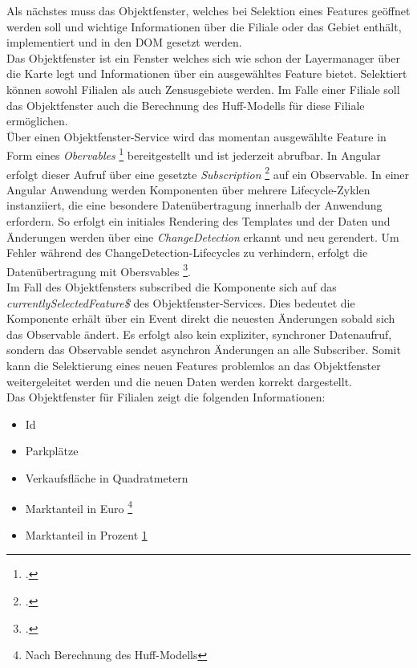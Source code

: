 Als nächstes muss das Objektfenster, welches bei Selektion eines Features geöffnet werden soll und wichtige Informationen über die Filiale oder das Gebiet enthält, implementiert und in den DOM gesetzt werden.\\
Das Objektfenster ist ein Fenster welches sich wie schon der Layermanager über die Karte legt und Informationen über ein ausgewähltes Feature bietet. 
Selektiert können sowohl Filialen als auch Zensusgebiete werden.
Im Falle einer Filiale soll das Objektfenster auch die Berechnung des Huff-Modells für diese Filiale ermöglichen.\\
Über einen Objektfenster-Service wird das momentan ausgewählte Feature in Form eines \emph{Obervables} \footcite{rxjs_observable} bereitgestellt und ist jederzeit abrufbar.
In Angular erfolgt dieser Aufruf über eine gesetzte \emph{Subscription} \footcite{rxjs_subscription} auf ein Observable.
In einer Angular Anwendung werden Komponenten über mehrere Lifecycle-Zyklen instanziiert, die eine besondere Datenübertragung innerhalb der Anwendung erfordern.
So erfolgt ein initiales Rendering des Templates und der Daten und Änderungen werden über eine \emph{ChangeDetection} erkannt und neu gerendert.
Um Fehler während des ChangeDetection-Lifecycles zu verhindern, erfolgt die Datenübertragung mit Obersvables \footcite{angular_lifecycle}.\\
Im Fall des Objektfensters subscribed die Komponente sich auf das \emph{currentlySelectedFeature\$} des Objektfenster-Services.
Dies bedeutet die Komponente erhält über ein Event direkt die neuesten Änderungen sobald sich das Observable ändert. 
Es erfolgt also kein expliziter, synchroner Datenaufruf, sondern das Observable sendet asynchron Änderungen an alle Subscriber.
Somit kann die Selektierung eines neuen Features problemlos an das Objektfenster weitergeleitet werden und die neuen Daten werden korrekt dargestellt. \\
Das Objektfenster für Filialen zeigt die folgenden Informationen:

\begin{itemize}
	\item Id
	\item Parkplätze
	\item Verkaufsfläche in Quadratmetern
	\item Marktanteil in Euro \footnote{\label{afterCalc}Nach Berechnung des Huff-Modells}
	\item Marktanteil in Prozent \cref{afterCalc}
\end{itemize}

